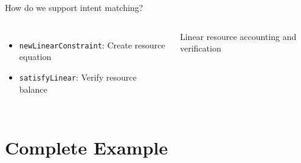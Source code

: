 \documentclass[handout,aspectratio=169,xcolor=dvipsnames,10pt]{beamer}
\begin{document}
\begin{frame}{How do we support intent matching?}
\begin{columns}[t]
\begin{itemize}\scriptsize
  \item \texttt{newLinearConstraint}: Create resource equation
  \item \texttt{satisfyLinear}: Verify resource balance
\end{itemize}

\vspace{0.2em}

{\tiny Linear resource accounting and verification}

\end{columns}

\vfill

\end{frame}



\section{Complete Example}
\end{document}
